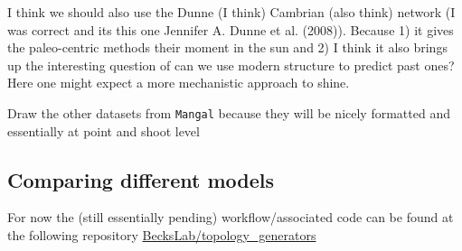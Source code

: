 \documentclass[
  letterpaper,
  DIV=11,
  numbers=noendperiod]{scrartcl}
\begin{document}
I think we should also use the Dunne (I think) Cambrian (also think)
network (I was correct and its this one Jennifer A. Dunne et al.
(2008)). Because 1) it gives the paleo-centric methods their moment in
the sun and 2) I think it also brings up the interesting question of can
we use modern structure to predict past ones? Here one might expect a
more mechanistic approach to shine.

Draw the other datasets from \texttt{Mangal} because they will be nicely
formatted and essentially at point and shoot level

\subsection{Comparing different
models}\label{comparing-different-models}

For now the (still essentially pending) workflow/associated code can be
found at the following repository
\href{https://github.com/BecksLab/topology_generators}{BecksLab/topology\_generators}
\end{document}
